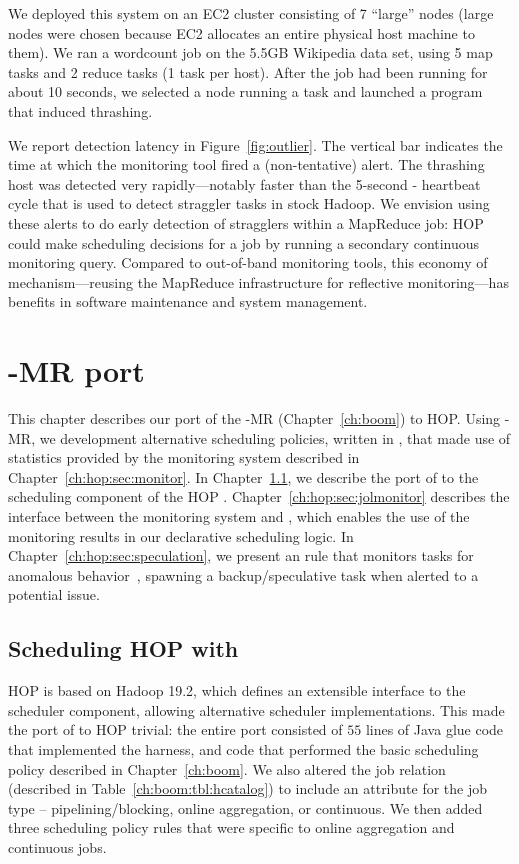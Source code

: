 We deployed this system on an EC2 cluster consisting of 7 ``large''
nodes (large nodes were chosen because EC2 allocates an entire
physical host machine to them). We ran a wordcount job on the 5.5GB Wikipedia
data set, using 5 map tasks and 2 reduce tasks (1 task per host). After
the job had been running for about 10 seconds, we selected a node
running a task and launched a program that induced thrashing.

We report detection latency in Figure~\ref{fig:outlier}. The vertical bar
indicates the time at which the monitoring tool fired a (non-tentative)
alert. The thrashing host was detected very rapidly---notably faster than the
5-second {\TT}-{\JT} heartbeat cycle that is used to detect straggler tasks in
stock Hadoop. We envision using these alerts to do early detection of stragglers
within a MapReduce job: HOP could make scheduling decisions for a job by running
a secondary continuous monitoring query. Compared to out-of-band monitoring
tools, this economy of mechanism---reusing the MapReduce infrastructure for
reflective monitoring---has benefits in software maintenance and system
management.

\section{\BOOM-MR port}
\label{ch:hop:sec:boom}

This chapter describes our port of the \BOOM-MR (Chapter~\ref{ch:boom}) to HOP.
Using \BOOM-MR, we development alternative scheduling policies, written in
\OVERLOG, that made use of statistics provided by the monitoring system
described in Chapter~\ref{ch:hop:sec:monitor}.  In
Chapter~\ref{ch:hop:sec:jolport}, we describe the port of \JOL to the
scheduling component of the HOP \JT.  Chapter~\ref{ch:hop:sec:jolmonitor}
describes the interface between the monitoring system and \JOL, which enables
the use of the monitoring results in our declarative scheduling logic.  In
Chapter~\ref{ch:hop:sec:speculation}, we present an \OVERLOG rule that monitors
tasks for anomalous behavior~\cite{hopdemo}, spawning a backup/speculative task
when alerted to a potential issue.

\subsection{Scheduling HOP with \JOL}
\label{ch:hop:sec:jolport}

HOP is based on Hadoop 19.2, which defines an extensible interface to the \JT
scheduler component, allowing alternative scheduler implementations.  This made
the port of \JOL to HOP trivial: the entire port consisted of $55$ lines of
Java glue code that implemented the \JOL harness, and \OVERLOG code that
performed the basic scheduling policy described in Chapter~\ref{ch:boom}.  We
also altered the job relation (described in Table~\ref{ch:boom:tbl:hcatalog})
to include an attribute for the job type -- pipelining/blocking, online
aggregation, or continuous.  We then added three scheduling policy rules that
were specific to online aggregation and continuous jobs.

